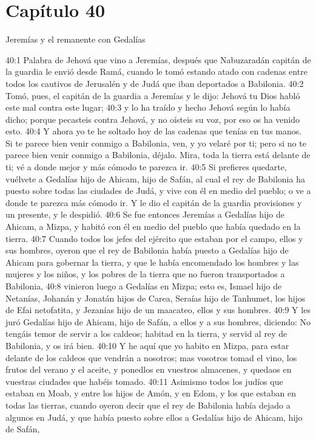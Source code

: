 \section*{Capítulo 40 }
Jeremías y el remanente con Gedalías 
 
40:1 Palabra de Jehová que vino a Jeremías, después que Nabuzaradán capitán de la guardia le envió desde Ramá, cuando le tomó estando atado con cadenas entre todos los cautivos de Jerusalén y de Judá que iban deportados a Babilonia. 
40:2 Tomó, pues, el capitán de la guardia a Jeremías y le dijo: Jehová tu Dios habló este mal contra este lugar; 
40:3 y lo ha traído y hecho Jehová según lo había dicho; porque pecasteis contra Jehová, y no oísteis su voz, por eso os ha venido esto. 
40:4 Y ahora yo te he soltado hoy de las cadenas que tenías en tus manos. Si te parece bien venir conmigo a Babilonia, ven, y yo velaré por ti; pero si no te parece bien venir conmigo a Babilonia, déjalo. Mira, toda la tierra está delante de ti; vé a donde mejor y más cómodo te parezca ir. 
40:5 Si prefieres quedarte, vuélvete a Gedalías hijo de Ahicam, hijo de Safán, al cual el rey de Babilonia ha puesto sobre todas las ciudades de Judá, y vive con él en medio del pueblo; o ve a donde te parezca más cómodo ir. Y le dio el capitán de la guardia provisiones y un presente, y le despidió. 
40:6 Se fue entonces Jeremías a Gedalías hijo de Ahicam, a Mizpa, y habitó con él en medio del pueblo que había quedado en la tierra. 
40:7 Cuando todos los jefes del ejército que estaban por el campo, ellos y sus hombres, oyeron que el rey de Babilonia había puesto a Gedalías hijo de Ahicam para gobernar la tierra, y que le había encomendado los hombres y las mujeres y los niños, y los pobres de la tierra que no fueron transportados a Babilonia, 
40:8 vinieron luego a Gedalías en Mizpa; esto es, Ismael hijo de Netanías, Johanán y Jonatán hijos de Carea, Seraías hijo de Tanhumet, los hijos de Efai netofatita, y Jezanías hijo de un maacateo, ellos y sus hombres. 
40:9 Y les juró Gedalías hijo de Ahicam, hijo de Safán, a ellos y a sus hombres, diciendo: No tengáis temor de servir a los caldeos; habitad en la tierra, y servid al rey de Babilonia, y os irá bien. 
40:10 Y he aquí que yo habito en Mizpa, para estar delante de los caldeos que vendrán a nosotros; mas vosotros tomad el vino, los frutos del verano y el aceite, y ponedlos en vuestros almacenes, y quedaos en vuestras ciudades que habéis tomado. 
40:11 Asimismo todos los judíos que estaban en Moab, y entre los hijos de Amón, y en Edom, y los que estaban en todas las tierras, cuando oyeron decir que el rey de Babilonia había dejado a algunos en Judá, y que había puesto sobre ellos a Gedalías hijo de Ahicam, hijo de Safán, 
